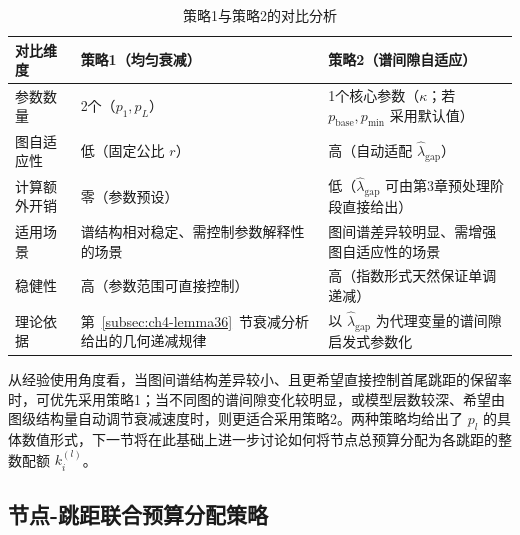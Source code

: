 \begin{table}[htbp]
  \centering
  \small
  \setlength{\tabcolsep}{4pt}
  \begin{threeparttable}
  \caption{策略1与策略2的对比分析}
  \label{tab:ch4-pl-strategies}
  \begin{tabular}{@{}>{\centering\arraybackslash}m{2.5cm}>{\centering\arraybackslash}m{5.0cm}>{\centering\arraybackslash}m{6.0cm}@{}}
    \toprule
    \textbf{对比维度} & \textbf{策略1（均匀衰减）} & \textbf{策略2（谱间隙自适应）} \\
    \midrule
    参数数量 & 2个（\(p_1,p_L\)） & 1个核心参数（\(\kappa\)；若 \(p_{\text{base}},p_{\min}\) 采用默认值） \\[3pt]
    图自适应性 & 低（固定公比 \(r\)） & 高（自动适配 \(\hat{\lambda}_{\text{gap}}\)） \\[3pt]
    计算额外开销 & 零（参数预设） & 低（\(\hat{\lambda}_{\text{gap}}\) 可由第3章预处理阶段直接给出） \\[3pt]
    适用场景 & 谱结构相对稳定、需控制参数解释性的场景 & 图间谱差异较明显、需增强图自适应性的场景 \\[3pt]
    稳健性 & 高（参数范围可直接控制） & 高（指数形式天然保证单调递减） \\[3pt]
    理论依据 & 第~\ref{subsec:ch4-lemma36}~节衰减分析给出的几何递减规律 & 以 \(\hat{\lambda}_{\text{gap}}\) 为代理变量的谱间隙启发式参数化 \\[3pt]
    \bottomrule
  \end{tabular}
  \end{threeparttable}
\end{table}

从经验使用角度看，当图间谱结构差异较小、且更希望直接控制首尾跳距的保留率时，可优先采用策略1；当不同图的谱间隙变化较明显，或模型层数较深、希望由图级结构量自动调节衰减速度时，则更适合采用策略2。两种策略均给出了 \(p_l\) 的具体数值形式，下一节将在此基础上进一步讨论如何将节点总预算分配为各跳距的整数配额 \(k_i^{(l)}\)。

\subsection{节点-跳距联合预算分配策略}
\label{subsec:ch4-theorem33}\label{idx:innov:joint_budget}

